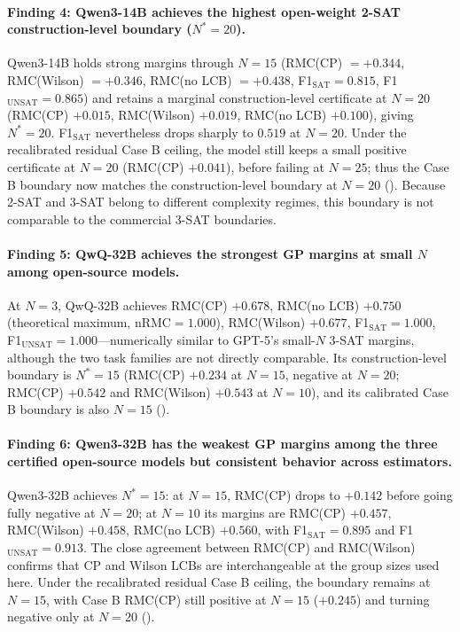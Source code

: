 \documentclass[conference]{IEEEtran}
\theoremstyle{remark}
\begin{document}
\paragraph{Finding 4: Qwen3-14B achieves the highest open-weight 2-SAT construction-level boundary ($N^*=20$).}
Qwen3-14B holds strong margins through $N=15$ (RMC(CP) $=+0.344$, RMC(Wilson) $=+0.346$, RMC(no LCB) $=+0.438$, F1$_{\mathrm{SAT}}=0.815$, F1$_{\mathrm{UNSAT}}=0.865$) and retains a marginal construction-level certificate at $N=20$ (RMC(CP) $+0.015$, RMC(Wilson) $+0.019$, RMC(no LCB) $+0.100$), giving $N^*=20$.
F1$_{\mathrm{SAT}}$ nevertheless drops sharply to $0.519$ at $N=20$.  Under the recalibrated residual Case B ceiling, the model still keeps a small positive certificate at $N=20$ (RMC(CP) $+0.041$), before failing at $N=25$; thus the Case B boundary now matches the construction-level boundary at $N=20$ ().
Because 2-SAT and 3-SAT belong to different complexity regimes, this boundary is not comparable to the commercial 3-SAT boundaries.

\paragraph{Finding 5: QwQ-32B achieves the strongest GP margins at small $N$ among open-source models.}
At $N=3$, QwQ-32B achieves RMC(CP) $+0.678$, RMC(no LCB) $+0.750$ (theoretical maximum, nRMC$=1.000$), RMC(Wilson) $+0.677$, F1$_{\mathrm{SAT}}=1.000$, F1$_{\mathrm{UNSAT}}=1.000$---numerically similar to GPT-5's small-$N$ 3-SAT margins, although the two task families are not directly comparable.
Its construction-level boundary is $N^*=15$ (RMC(CP) $+0.234$ at $N=15$, negative at $N=20$; RMC(CP) $+0.542$ and RMC(Wilson) $+0.543$ at $N=10$), and its calibrated Case B boundary is also $N=15$ ().

\paragraph{Finding 6: Qwen3-32B has the weakest GP margins among the three certified open-source models but consistent behavior across estimators.}
Qwen3-32B achieves $N^*=15$: at $N=15$, RMC(CP) drops to $+0.142$ before going fully negative at $N=20$; at $N=10$ its margins are RMC(CP) $+0.457$, RMC(Wilson) $+0.458$, RMC(no LCB) $+0.560$, with F1$_{\mathrm{SAT}}=0.895$ and F1$_{\mathrm{UNSAT}}=0.913$.
The close agreement between RMC(CP) and RMC(Wilson) confirms that CP and Wilson LCBs are interchangeable at the group sizes used here.
Under the recalibrated residual Case B ceiling, the boundary remains at $N=15$, with Case B RMC(CP) still positive at $N=15$ ($+0.245$) and turning negative only at $N=20$ ().
\end{document}
